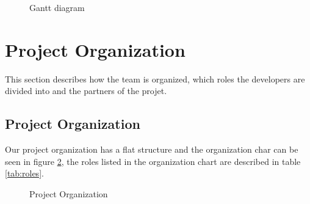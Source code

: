 \begin{figure}[!ht]
	\noindent{}
	\caption{Gantt diagram\label{fig:gantt}}
\end{figure}

\section{Project Organization}
This section describes how the team is organized, which roles the developers are divided into and the partners of the projet.

\subsection{Project Organization}
Our project organization has a flat structure and the organization char can be seen in figure \ref{fig:orgchart}, the roles listed in the organization chart are described in table \ref{tab:roles}.

\begin{figure}[here]
	\noindent{}
	\caption{Project Organization\label{fig:orgchart}}
\end{figure}


